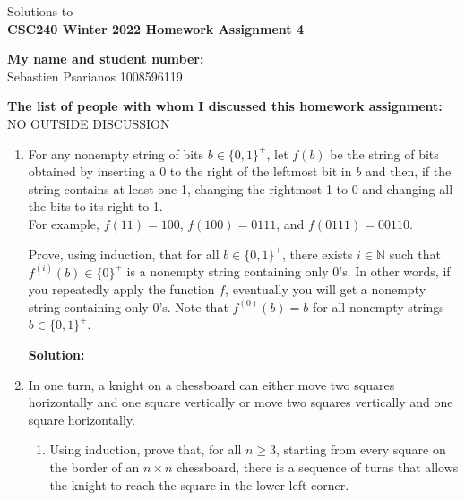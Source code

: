 \documentclass[11pt]{article}
\def\nats {{\mathbb N}}
\begin{document}
\begin{center}
Solutions to\\
{\bf \Large \bf CSC240 Winter 2022 Homework Assignment 4}
\end{center}

\noindent
{\bf My name and student number:}\\
Sebastien Psarianos 1008596119

\medskip

\noindent
{\bf The list of people with whom I discussed this homework assignment:}\\
NO OUTSIDE DISCUSSION

\begin{enumerate}
\item
\begin{question}
For any nonempty string of bits $b \in \{0,1\}^+$,
let $f(b)$ be the string of bits obtained by
inserting a 0 to the right of the leftmost bit in $b$ and then, if the string contains at least one 1,
changing the rightmost 1 to 0 and changing all the bits to its right to 1.\\
For example, $f(11) = 100$, $f(100)  = 0111$, and $f(0111) = 00110$.

Prove, using induction, that for all $b \in \{0,1\}^+$,  there exists $i \in \nats$ such that $f^{(i)}(b) \in \{0\}^+$
 is a nonempty string containing only 0's.
In other words, if you repeatedly apply the function $f$, eventually you will get a nonempty string containing only 0's.
Note that $f^{(0)}(b) = b$ for all nonempty strings $b \in \{0,1\}^+$.
\end{question}

\begin{solution}
{\bf Solution:}\\

\end{solution}


\item
\begin{question}
In one turn, a knight on a chessboard can either move two squares horizontally and one square vertically
or move two squares vertically and one square horizontally.
\end{question}

\begin{enumerate}
\item
\begin{question}
Using induction, prove that, for all $n \geq 3$, starting from every square on the border of an $n \times n$ chessboard, there is a sequence of turns that allows the knight to reach the square in the lower left corner.
\end{question}


\end{enumerate}
\end{enumerate}
\end{document}
